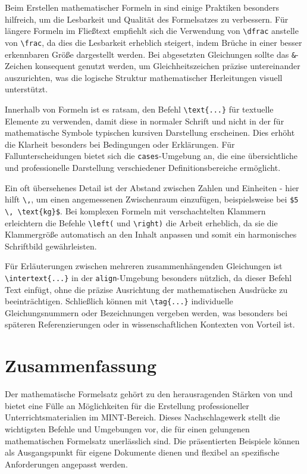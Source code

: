 \documentclass[12pt,a4paper]{article}
\begin{document}
Beim Erstellen mathematischer Formeln in  sind einige Praktiken besonders hilfreich, um die Lesbarkeit und Qualität des Formelsatzes zu verbessern. Für längere Formeln im Fließtext empfiehlt sich die Verwendung von \texttt{\textbackslash dfrac} anstelle von \texttt{\textbackslash frac}, da dies die Lesbarkeit erheblich steigert, indem Brüche in einer besser erkennbaren Größe dargestellt werden. Bei abgesetzten Gleichungen sollte das \texttt{\&}-Zeichen konsequent genutzt werden, um Gleichheitszeichen präzise untereinander auszurichten, was die logische Struktur mathematischer Herleitungen visuell unterstützt.

Innerhalb von Formeln ist es ratsam, den Befehl \texttt{\textbackslash text\{...\}} für textuelle Elemente zu verwenden, damit diese in normaler Schrift und nicht in der für mathematische Symbole typischen kursiven Darstellung erscheinen. Dies erhöht die Klarheit besonders bei Bedingungen oder Erklärungen. Für Fallunterscheidungen bietet sich die \texttt{cases}-Umgebung an, die eine übersichtliche und professionelle Darstellung verschiedener Definitionsbereiche ermöglicht.

Ein oft übersehenes Detail ist der Abstand zwischen Zahlen und Einheiten - hier hilft \texttt{\textbackslash,}, um einen angemessenen Zwischenraum einzufügen, beispielsweise bei \texttt{\$5 \textbackslash, \textbackslash text\{kg\}\$}. Bei komplexen Formeln mit verschachtelten Klammern erleichtern die Befehle \texttt{\textbackslash left(} und \texttt{\textbackslash right)} die Arbeit erheblich, da sie die Klammergröße automatisch an den Inhalt anpassen und somit ein harmonisches Schriftbild gewährleisten.

Für Erläuterungen zwischen mehreren zusammenhängenden Gleichungen ist \texttt{\textbackslash intertext\{...\}} in der \texttt{align}-Umgebung besonders nützlich, da dieser Befehl Text einfügt, ohne die präzise Ausrichtung der mathematischen Ausdrücke zu beeinträchtigen. Schließlich können mit \texttt{\textbackslash tag\{...\}} individuelle Gleichungsnummern oder Bezeichnungen vergeben werden, was besonders bei späteren Referenzierungen oder in wissenschaftlichen Kontexten von Vorteil ist.



\section{Zusammenfassung}

Der mathematische Formelsatz gehört zu den herausragenden Stärken von  und bietet eine Fülle an Möglichkeiten für die Erstellung professioneller Unterrichtsmaterialien im MINT-Bereich. Dieses Nachschlagewerk stellt die wichtigsten Befehle und Umgebungen vor, die für einen gelungenen mathematischen Formelsatz unerlässlich sind. Die präsentierten Beispiele können als Ausgangspunkt für eigene Dokumente dienen und flexibel an spezifische Anforderungen angepasst werden.
\end{document}
